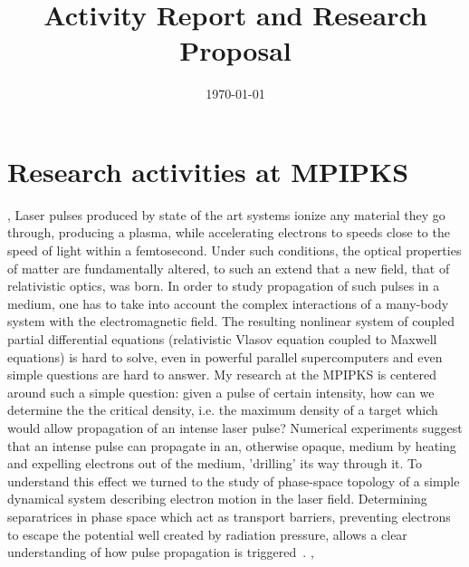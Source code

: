 \documentclass[11pt,a4paper,final]{moderncv}
\title{\large{Activity Report and Research Proposal}}               %
\date{\today}
\begin{document}
\maketitle



\section{Research activities at MPIPKS}
\sep
{}
Laser pulses produced by state of the art systems ionize any material they go through, 
producing a plasma, while accelerating electrons to speeds close to the speed of light within a femtosecond. 
Under such conditions, the optical properties of matter are fundamentally altered, to such an extend that a new field, that of relativistic optics, was born. 
In order to study propagation of such pulses in a medium, one has to take into account the complex interactions of a many-body system with the electromagnetic field.
The resulting nonlinear system of coupled partial differential equations (relativistic Vlasov equation coupled to Maxwell equations) is hard to solve, 
even in powerful parallel supercomputers and even simple questions are hard to answer. 
My research at the MPIPKS is centered around such a simple question: given a pulse of certain intensity, how can we determine the the critical density, 
i.e. the maximum density of a target which would allow propagation of an intense laser pulse? Numerical experiments suggest that 
an intense pulse can propagate in an, otherwise opaque, medium by heating and expelling electrons out of the medium, 'drilling' its way through it. 
To understand this effect we turned to the study of phase-space topology of a simple dynamical system describing electron motion in the laser field. 
Determining separatrices in phase space which act as transport barriers, preventing electrons to escape the potential well created by radiation pressure, 
allows a clear understanding of how pulse propagation is triggered~\cite{siminos2012}.
\sep 
\end{document}
